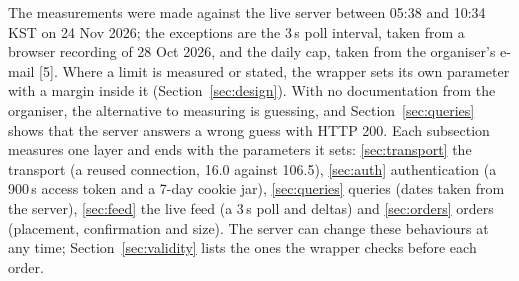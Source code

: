 \seclabel
{}

 The measurements were made against the live server between 05:38 and 10:34 KST on 24 Nov 2026; the exceptions are the 3\,s poll interval, taken from a browser recording of 28 Oct 2026, and the daily cap, taken from the organiser's e-mail [5]. Where a limit is measured or stated, the wrapper sets its own parameter with a margin inside it (Section~\ref{sec:design}). With no documentation from the organiser, the alternative to measuring is guessing, and Section~\ref{sec:queries} shows that the server answers a wrong guess with HTTP 200. Each subsection measures one layer and ends with the parameters it sets: \ref{sec:transport} the transport (a reused connection, 16.0\ms{} against 106.5\ms), \ref{sec:auth} authentication (a 900\,s access token and a 7-day cookie jar), \ref{sec:queries} queries (dates taken from the server), \ref{sec:feed} the live feed (a 3\,s poll and deltas) and \ref{sec:orders} orders (placement, confirmation and size). The server can change these behaviours at any time; Section~\ref{sec:validity} lists the ones the wrapper checks before each order.
